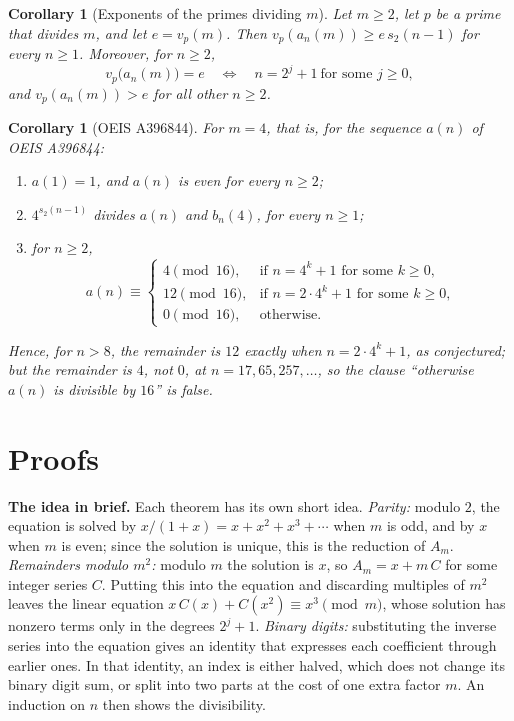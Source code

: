 \documentclass[11pt,a4paper]{article}
\newtheorem{corollary}[theorem]{Corollary}
\theoremstyle{definition}
\theoremstyle{remark}
\newcommand{\para}[1]{\par\medskip\noindent\textbf{#1}\enspace}
\begin{document}
\begin{corollary}[Exponents of the primes dividing $m$]\label{cor:val}
Let $m\ge2$, let $p$ be a prime that divides $m$, and let $e=v_p(m)$. Then $v_p(a_n(m))\ge e\,s_2(n-1)$ for every
$n\ge1$. Moreover, for $n\ge2$,
\[
v_p\bigl(a_n(m)\bigr)=e\quad\Longleftrightarrow\quad n=2^j+1\ \text{for some }j\ge0,
\]
and $v_p(a_n(m))>e$ for all other $n\ge2$.
\end{corollary}

\begin{corollary}[OEIS A396844]\label{cor:entry}
For $m=4$, that is, for the sequence $a(n)$ of OEIS A396844:
\begin{enumerate}[label=(\alph*)]
\item $a(1)=1$, and $a(n)$ is even for every $n\ge2$;
\item $4^{s_2(n-1)}$ divides $a(n)$ and $b_n(4)$, for every $n\ge1$;
\item for $n\ge2$,
\[
a(n)\equiv\begin{cases}4\pmod{16},&\text{if }n=4^k+1\text{ for some }k\ge0,\\
12\pmod{16},&\text{if }n=2\cdot4^k+1\text{ for some }k\ge0,\\
0\pmod{16},&\text{otherwise.}\end{cases}
\]
\end{enumerate}
Hence, for $n>8$, the remainder is $12$ exactly when $n=2\cdot4^k+1$, as conjectured; but the remainder is $4$, not $0$,
at $n=17,65,257,\dots$, so the clause ``otherwise $a(n)$ is divisible by $16$'' is false.
\end{corollary}

\section{Proofs}\label{sec:proofs}

\para{The idea in brief.} Each theorem has its own short idea.
\emph{Parity:} modulo $2$, the equation is solved by $x/(1+x)=x+x^2+x^3+\cdots$ when $m$ is odd, and by $x$ when $m$ is
even; since the solution is unique, this is the reduction of $A_m$.
\emph{Remainders modulo $m^2$:} modulo $m$ the solution is $x$, so $A_m=x+m\,C$ for some integer series $C$.
Putting this into the equation and discarding multiples of $m^2$ leaves the linear equation
$x\,C(x)+C(x^2)\equiv x^3\pmod m$, whose solution has nonzero terms only in the degrees $2^j+1$.
\emph{Binary digits:} substituting the inverse series into the equation gives an identity that expresses each
coefficient through earlier ones. In that identity, an index is either halved, which does not change its binary digit
sum, or split into two parts at the cost of one extra factor $m$. An induction on $n$ then shows the divisibility.
\end{document}
